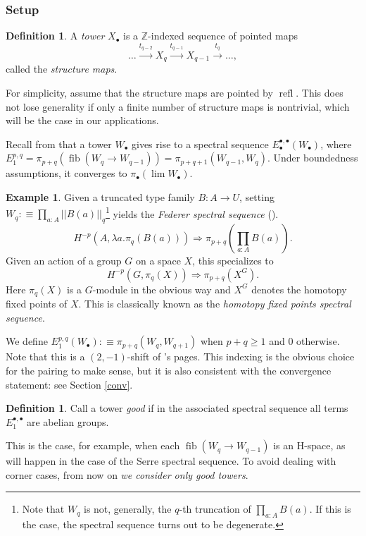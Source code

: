 \documentclass{amsart}
\theoremstyle{definition}
\newtheorem{de}[theorem]{Definition}
\newtheorem{exa}[theorem]{Example}
\newcommand{\refl}{\operatorname{refl}}
\newcommand{\fib}{\operatorname{fib}}
\newcommand{\depfun}[2]{\prod\limits_{#1}^{}{#2}}
\begin{document}
\subsubsection{Setup}

\begin{de}
    A \textit{tower} $X_\bullet$ is a $\mathbb{Z}$-indexed sequence of pointed maps
    $$\ldots \xrightarrow{t_{q-2}} X_q \xrightarrow{t_{q-1}} X_{q-1} \xrightarrow{t_q} \ldots,$$
    called the \textit{structure maps}.
\end{de}

For simplicity, assume that the structure maps are pointed by $\refl$. This does not lose generality if only a finite number of structure maps is nontrivial, which will be the case in our applications.

Recall from \cite{Flo} that a tower $W_\bullet$ gives rise to a spectral sequence $E^{\bullet,\bullet}_\bullet(W_\bullet)$, where $E_1^{p,q} = \pi_{p+q}(\fib(W_{q} \to W_{q-1})) = \pi_{p+q+1}(W_{q-1}, W_{q})$. Under boundedness assumptions, it converges to $\pi_{\bullet}(\lim W_{\bullet})$.

\begin{exa}
    Given a truncated type family $B: A \to U$, setting $W_q :\equiv \depfun{a:A}{||B(a)||_q}$\footnote{Note that $W_q$ is not, generally, the $q$-th truncation of $\depfun{a:A}{B(a)}$. If this is the case, the spectral sequence turns out to be degenerate.} yields the \textit{Federer spectral sequence} (\cite{Fed}).
    $$H^{-p}(A, \lambda a.\pi_q(B(a))) \Rightarrow{} \pi_{p+q}(\depfun{a:A}{B(a)}).$$
    Given an action of a group $G$ on a space $X$, this specializes to
    $$H^{-p}(G, \pi_q(X)) \Rightarrow{} \pi_{p+q}(X^G).$$
    Here $\pi_q(X)$ is a $G$-module in the obvious way and $X^G$ denotes the homotopy fixed points of $X$. This is classically known as the \textit{homotopy fixed points spectral sequence}.


\end{exa}

We define $E_1^{p, q}(W_\bullet) : \equiv \pi_{p+q}(W_q, W_{q+1})$ when $p+q \geq 1$ and $0$ otherwise. Note that this is a $(2, -1)$-shift of \cite{Flo}'s pages. This indexing is the obvious choice for the pairing to make sense, but it is also consistent with the convergence statement: see Section \ref{conv}.

\begin{de}\label{de:good}
    Call a tower \textit{good} if in the associated spectral sequence all terms $E_1^{\bullet, \bullet}$ are abelian groups.
\end{de}
This is the case, for example, when each $\fib(W_{q} \to W_{q-1})$ is an H-space, as will happen in the case of the Serre spectral sequence. To avoid dealing with corner cases, from now on \textit{we consider only good towers}.
\end{document}
